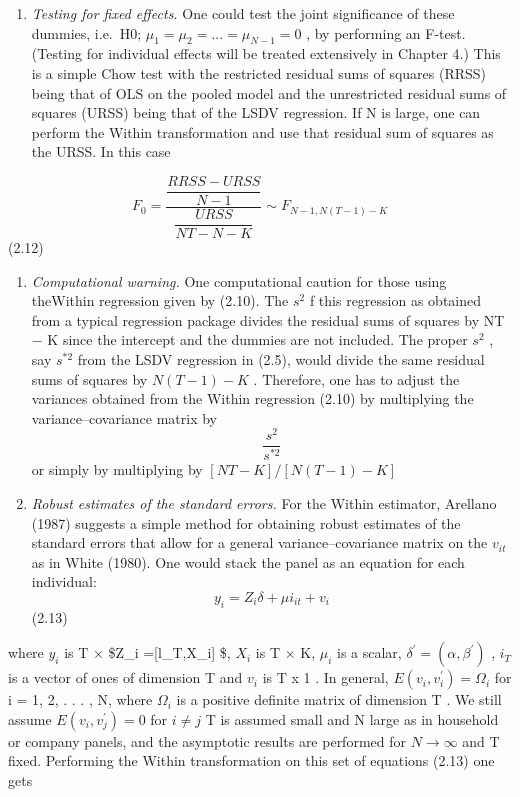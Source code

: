 \documentclass[
]{book}
\providecommand{\tightlist}{%
  \setlength{\itemsep}{0pt}\setlength{\parskip}{0pt}}
\begin{document}
\begin{enumerate}
\def\labelenumi{(\arabic{enumi})}
\tightlist
\item
  \emph{Testing for fixed effects.} One could test the joint significance of these dummies, i.e.~H0; \(\mu_{1}=\mu_{2}= ... = \mu_{N-1}=0\) , by performing an F-test. (Testing for individual effects will be treated extensively in Chapter 4.) This is a simple Chow test with the restricted residual sums of squares (RRSS) being that of OLS on the pooled model and the unrestricted residual sums of squares (URSS) being that of the LSDV regression. If N is large, one can perform the Within transformation and use that residual sum of squares as the URSS. In this case
\end{enumerate}

\[F_{0}=    \frac{ \dfrac{RRSS-URSS}{N-1}}{\dfrac{URSS}{NT-N-K} } \sim  F_{N-1,N(T-1)-K}           \] (2.12)

\begin{enumerate}
\def\labelenumi{(\arabic{enumi})}
\setcounter{enumi}{1}
\item
  \emph{Computational warning.} One computational caution for those using theWithin regression given by (2.10). The \(s^{2}\) f this regression as obtained from a typical regression package divides the residual sums of squares by NT − K since the intercept and the dummies are not included. The proper \(s^{2}\) , say \(s^{*2}\) from the LSDV regression in (2.5), would divide the same residual sums of squares by \(N(T − 1) − K\) . Therefore, one has to adjust the variances obtained from the Within regression (2.10) by multiplying the variance--covariance matrix by \[\frac{s^{2}}{s^{*2}} \] or simply by multiplying by \([NT − K]/[N(T − 1) − K]\)
\item
  \emph{Robust estimates of the standard errors.} For the Within estimator, Arellano (1987) suggests a simple method for obtaining robust estimates of the standard errors that allow for a general variance--covariance matrix on the \(v_{it}\) as in White (1980). One would stack the panel as an equation for each individual: \[y_{i}= Z_{i} \delta + \mu i_{it} + v_{i} \] (2.13)
\end{enumerate}

where \(y_i\) is T × \$Z\_i ={[}l\_T,X\_i{]} \$, \(X_i\) is T × K, \(\mu _i\) is a scalar, \(\delta ^{\prime} = (\alpha, \beta^{\prime} )\) , \(i_T\) is a vector of ones of dimension T and \(v_i\) is T x 1 . In general, \(E(v_i,v_i^{\prime}) = \Omega _ i\) for i = 1, 2, . . . , N, where \(\Omega _i\) is a positive definite matrix of dimension T . We still assume \(E(v_i,v_j^{\prime}) =0\) for \(i \ne j\) T is assumed small and N large as in household or company panels, and the asymptotic results are performed for \(N \rightarrow \infty\) and T fixed. Performing the Within transformation on this set of equations (2.13) one gets
\end{document}
